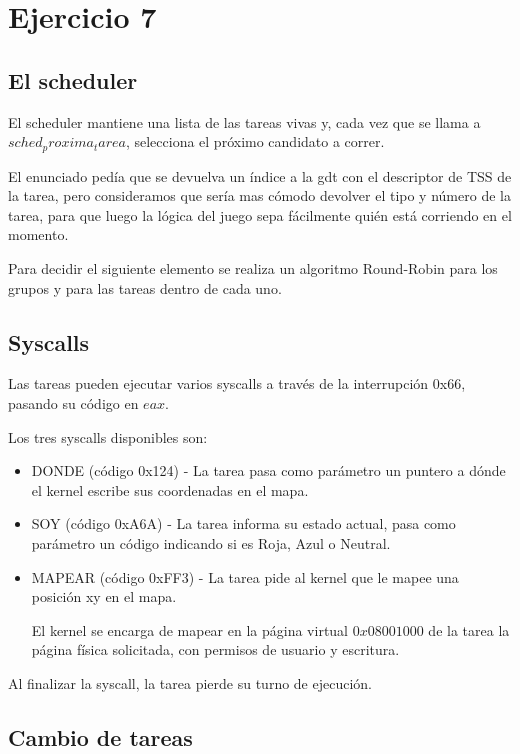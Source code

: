 \section{Ejercicio 7}

\subsection{El scheduler}

El scheduler mantiene una lista de las tareas vivas y, cada vez que se llama a $sched_proxima_tarea$,
selecciona el próximo candidato a correr.

El enunciado pedía que se devuelva un índice a la gdt con el descriptor de TSS de la tarea,
pero consideramos que sería mas cómodo devolver el tipo y número de la tarea, para que luego
la lógica del juego sepa fácilmente quién está corriendo en el momento.

Para decidir el siguiente elemento se realiza un algoritmo Round-Robin para los grupos y
para las tareas dentro de cada uno.

\subsection{Syscalls}

Las tareas pueden ejecutar varios syscalls a través de la interrupción 0x66,
pasando su código en $eax$.

Los tres syscalls disponibles son:

\begin{itemize}
    \item DONDE (código 0x124) - La tarea pasa como parámetro un puntero a dónde
        el kernel escribe sus coordenadas en el mapa.
    \item SOY (código 0xA6A) - La tarea informa su estado actual,
        pasa como parámetro un código indicando si es Roja, Azul o Neutral.
    \item MAPEAR (código 0xFF3) - La tarea pide al kernel que le mapee una posición xy en el mapa.

        El kernel se encarga de mapear en la página virtual $0x08001000$ de la tarea
        la página física solicitada, con permisos de usuario y escritura.
\end{itemize}

Al finalizar la syscall, la tarea pierde su turno de ejecución.

\subsection{Cambio de tareas}

